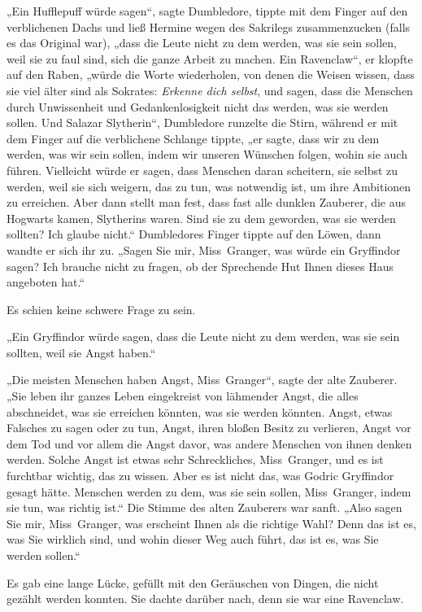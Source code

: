 {„Ein Hufflepuff würde sagen“, sagte Dumbledore, tippte mit dem Finger auf den verblichenen Dachs und ließ Hermine wegen des Sakrilegs zusammenzucken (falls es das Original war), „dass die Leute nicht zu dem werden, was sie sein sollen, weil sie zu faul sind, sich die ganze Arbeit zu machen. Ein Ravenclaw“, er klopfte auf den Raben, „würde die Worte wiederholen, von denen die Weisen wissen, dass sie viel älter sind als Sokrates: \emph{Erkenne dich selbst}, und sagen, dass die Menschen durch Unwissenheit und Gedankenlosigkeit nicht das werden, was sie werden sollen. Und Salazar Slytherin“, Dumbledore runzelte die Stirn, während er mit dem Finger auf die verblichene Schlange tippte, „er sagte, dass wir zu dem werden, was wir sein sollen, indem wir unseren Wünschen folgen, wohin sie auch führen. Vielleicht würde er sagen, dass Menschen daran scheitern, sie selbst zu werden, weil sie sich weigern, das zu tun, was notwendig ist, um ihre Ambitionen zu erreichen. Aber dann stellt man fest, dass fast alle dunklen Zauberer, die aus Hogwarts kamen, Slytherins waren. Sind sie zu dem geworden, was sie werden sollten? Ich glaube nicht.“ Dumbledores Finger tippte auf den Löwen, dann wandte er sich ihr zu. „Sagen Sie mir, Miss~Granger, was würde ein Gryffindor sagen? Ich brauche nicht zu fragen, ob der Sprechende Hut Ihnen dieses Haus angeboten hat.“

Es schien keine schwere Frage zu sein.

„Ein Gryffindor würde sagen, dass die Leute nicht zu dem werden, was sie sein sollten, weil sie Angst haben.“

„Die meisten Menschen haben Angst, Miss~Granger“, sagte der alte Zauberer. „Sie leben ihr ganzes Leben eingekreist von lähmender Angst, die alles abschneidet, was sie erreichen könnten, was sie werden könnten. Angst, etwas Falsches zu sagen oder zu tun, Angst, ihren bloßen Besitz zu verlieren, Angst vor dem Tod und vor allem die Angst davor, was andere Menschen von ihnen denken werden. Solche Angst ist etwas sehr Schreckliches, Miss~Granger, und es ist furchtbar wichtig, das zu wissen. Aber es ist nicht das, was Godric Gryffindor gesagt hätte. Menschen werden zu dem, was sie sein sollen, Miss~Granger, indem sie tun, was richtig ist.“ Die Stimme des alten Zauberers war sanft. „Also sagen Sie mir, Miss~Granger, was erscheint Ihnen als die richtige Wahl? Denn das ist es, was Sie wirklich sind, und wohin dieser Weg auch führt, das ist es, was Sie werden sollen.“

Es gab eine lange Lücke, gefüllt mit den Geräuschen von Dingen, die nicht gezählt werden konnten. Sie dachte darüber nach, denn sie war eine Ravenclaw.

}
